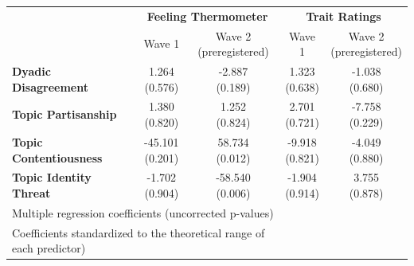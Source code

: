 \begin{tabular}{lcccc}
\hline
\multirow{2}{*}{~} & \multicolumn{2}{c}{\textbf{Feeling Thermometer}} & \multicolumn{2}{c}{\textbf{Trait Ratings}} \\
 & Wave 1 & \makecell{Wave 2 \\ (preregistered)} & Wave 1 & \makecell{Wave 2 \\ (preregistered)} \\
\hline

\textbf{Dyadic Disagreement} & \makecell{1.264 \\ (0.576)} & \makecell{-2.887 \\ (0.189)} & \makecell{1.323 \\ (0.638)} & \makecell{-1.038 \\ (0.680)} \\
\textbf{Topic Partisanship} & \makecell{1.380 \\ (0.820)} & \makecell{1.252 \\ (0.824)} & \makecell{2.701 \\ (0.721)} & \makecell{-7.758 \\ (0.229)} \\
\textbf{Topic Contentiousness} & \makecell{-45.101 \\ (0.201)} & \makecell{58.734 \\ (0.012)} & \makecell{-9.918 \\ (0.821)} & \makecell{-4.049 \\ (0.880)} \\
\textbf{Topic Identity Threat} & \makecell{-1.702 \\ (0.904)} & \makecell{-58.540 \\ (0.006)} & \makecell{-1.904 \\ (0.914)} & \makecell{3.755 \\ (0.878)} \\
\hline
 \multicolumn{3}{l}{\footnotesize Multiple regression coefficients (uncorrected p-values)}\\
 \multicolumn{3}{l}{\footnotesize Coefficients standardized to the theoretical range of each predictor)}\\
 \hline
\end{tabular}
